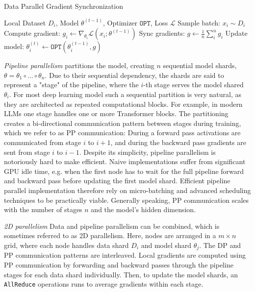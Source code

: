 \documentclass{article}
\begin{document}
\begin{algorithm}
\caption{Data Parallel Gradient Synchronization}
\label{alg:dp}
\begin{algorithmic}
 Local Dataset $D_i$, Model $\theta^{(t-1)}$, Optimizer $\mathtt{OPT}$, Loss $\mathcal{L}$
\STATE Sample batch: $x_i\sim D_i$
\STATE Compute gradient: $g_i \gets \nabla_{\theta_i} \mathcal{L}(x_i; \theta^{(t-1)})$
\STATE Sync gradients: $g \gets \frac{1}{n}\sum_{i}^n g_i$ 
\STATE Update model: $\theta_i^{(t)} \gets \mathtt{OPT}(\theta_i^{(t-1)}, g)$
\end{algorithmic}
\end{algorithm}

\textit{Pipeline parallelism} partitions the model, creating $n$ sequential
model shards, $\theta=\theta_1\circ\dots\circ\theta_n$. Due to their sequential
dependency, the shards are said to represent a "stage" of the pipeline, where
the $i$-th stage serves the model shared $\theta_i$. For most deep learning
model such a sequential partition is very natural, as they are architected as
repeated computational blocks. For example, in modern LLMs one stage handles one
or more Transformer blocks. The partitioning creates a bi-directional
communication pattern between stages during training, which we refer to as PP
communication: During a forward pass activations are communicated from stage $i$
to $i+1$, and during the backward pass gradients are sent from stage $i$ to
$i-1$.  Despite its simplicity, pipeline parallelism is notoriously hard to make
efficient. Naive implementations suffer from significant GPU idle time, e.g.
when the first node has to wait for the full pipeline forward and backward pass
before updating the first model shard. Efficient pipeline parallel
implementation therefore rely on micro-batching and advanced scheduling
techniques to be practically viable. Generally speaking, PP communication scales
with the number of stages $n$ and the model's hidden dimension.

\textit{2D parallelism} Data and pipeline parallelism can be combined, which is
sometimes referred to as 2D parallelism. Here, nodes are arranged in a $m\times
n$ grid, where each node handles data shard $D_i$ and model shard $\theta_j$.
The DP and PP communication patterns are interleaved. Local gradients are
computed using PP communication by forwarding and backward passes through the
pipeline stages for each data shard individually. Then, to update the model
shards, an \texttt{AllReduce} operations runs to average gradients within each
stage.
\end{document}
